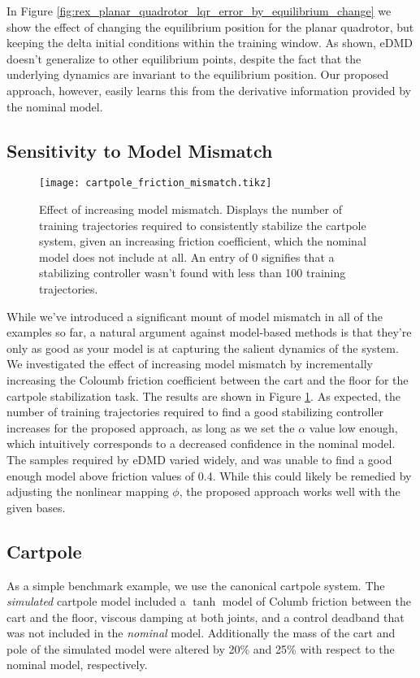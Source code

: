\documentclass{article}
\begin{document}
In Figure \ref{fig:rex_planar_quadrotor_lqr_error_by_equilibrium_change} we show the effect 
of changing the equilibrium position for the planar quadrotor, but keeping the delta initial
conditions within the training window. As shown, eDMD doesn't generalize to other
equilibrium points, despite the fact that the underlying dynamics are invariant to the
equilibrium position. Our proposed approach, however, easily learns this from the derivative
information provided by the nominal model.

\subsection{Sensitivity to Model Mismatch}
\begin{figure}
  \centering
  \texttt{[image: cartpole\_friction\_mismatch.tikz]}
  \caption{Effect of increasing model mismatch. Displays the number of training trajectories
    required to consistently stabilize the cartpole system, given an increasing friction 
    coefficient, which the nominal model does not include at all. An entry of 0 signifies 
    that a stabilizing controller wasn't found with less than 100 training trajectories.
  }
  \label{fig:cartpole_friction_mismatch}
\end{figure}

While we've introduced a significant mount of model mismatch in all of the examples so far, 
a natural argument against model-based methods is that they're only as good as your model is
at capturing the salient dynamics of the system. We investigated the effect of increasing
model mismatch by incrementally increasing the Coloumb friction coefficient between the cart
and the floor for the cartpole stabilization task. The results are shown in Figure 
\ref{fig:cartpole_friction_mismatch}. As expected, the number of training trajectories 
required to find a good stabilizing controller increases for the proposed approach, as long 
as we set the $\alpha$ value low enough, which intuitively corresponds to a decreased 
confidence in the nominal model. The samples required by eDMD varied widely, and was unable 
to find a good enough model above friction values of 0.4. While this could likely be
remedied by adjusting the nonlinear mapping $\phi$, the proposed approach works well with
the given bases.

\subsection{Cartpole}
As a simple benchmark example, we use the canonical cartpole system. 
The \textit{simulated}
cartpole model included a $\tanh$ model of Columb friction between the cart and the 
floor, viscous damping at both joints, and a control deadband that was not included in the 
\textit{nominal} model. Additionally the mass of the cart and pole of the simulated model 
were altered by 20\% and 25\% with respect to the nominal model, respectively. 
\end{document}
